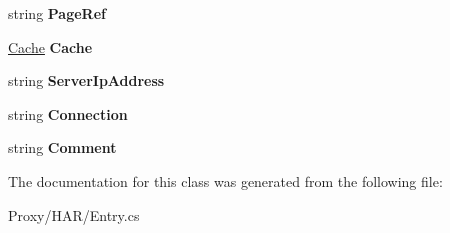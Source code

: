 \begin{DoxyCompactItemize}
\item 
\hypertarget{class_proto_test_1_1_golem_1_1_proxy_1_1_h_a_r_1_1_entry_a6c477baac338e581c6dcf5a3c7e5aaa7}{string {\bfseries Page\-Ref}}\label{class_proto_test_1_1_golem_1_1_proxy_1_1_h_a_r_1_1_entry_a6c477baac338e581c6dcf5a3c7e5aaa7}

\item 
\hypertarget{class_proto_test_1_1_golem_1_1_proxy_1_1_h_a_r_1_1_entry_a25055f32334626d6b5b4afed1c0f6498}{\hyperlink{class_proto_test_1_1_golem_1_1_proxy_1_1_h_a_r_1_1_cache}{Cache} {\bfseries Cache}}\label{class_proto_test_1_1_golem_1_1_proxy_1_1_h_a_r_1_1_entry_a25055f32334626d6b5b4afed1c0f6498}

\item 
\hypertarget{class_proto_test_1_1_golem_1_1_proxy_1_1_h_a_r_1_1_entry_a3b20e0bb3ecfe3b5d1417c1c6ff8de63}{string {\bfseries Server\-Ip\-Address}}\label{class_proto_test_1_1_golem_1_1_proxy_1_1_h_a_r_1_1_entry_a3b20e0bb3ecfe3b5d1417c1c6ff8de63}

\item 
\hypertarget{class_proto_test_1_1_golem_1_1_proxy_1_1_h_a_r_1_1_entry_a2dceb3fc9ba487efd42a44f0235a5769}{string {\bfseries Connection}}\label{class_proto_test_1_1_golem_1_1_proxy_1_1_h_a_r_1_1_entry_a2dceb3fc9ba487efd42a44f0235a5769}

\item 
\hypertarget{class_proto_test_1_1_golem_1_1_proxy_1_1_h_a_r_1_1_entry_a19ee9b5df9d48dc841f26441ea03be11}{string {\bfseries Comment}}\label{class_proto_test_1_1_golem_1_1_proxy_1_1_h_a_r_1_1_entry_a19ee9b5df9d48dc841f26441ea03be11}

\end{DoxyCompactItemize}


The documentation for this class was generated from the following file\-:\begin{DoxyCompactItemize}
\item 
Proxy/\-H\-A\-R/Entry.\-cs\end{DoxyCompactItemize}
